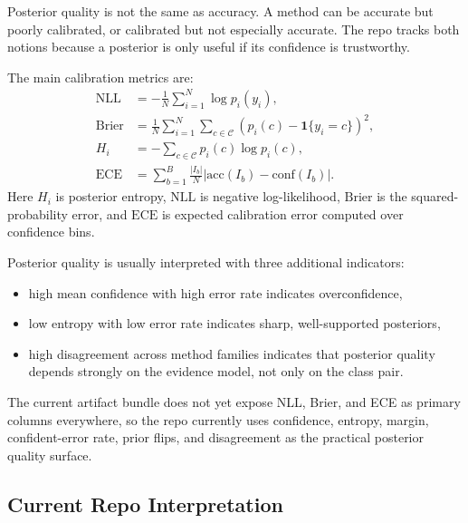 \documentclass[11pt]{article}
\begin{document}
Posterior quality is not the same as accuracy. A method can be accurate but
poorly calibrated, or calibrated but not especially accurate. The repo tracks
both notions because a posterior is only useful if its confidence is
trustworthy.

The main calibration metrics are:
\begin{align}
    \mathrm{NLL}
    &=
    -\frac{1}{N}\sum_{i=1}^{N}\log p_i(y_i), \\
    \mathrm{Brier}
    &=
    \frac{1}{N}\sum_{i=1}^{N}\sum_{c\in\mathcal{C}}
    \left(p_i(c)-\mathbf{1}\{y_i=c\}\right)^2, \\
    H_i
    &=
    -\sum_{c\in\mathcal{C}} p_i(c)\log p_i(c), \\
    \mathrm{ECE}
    &=
    \sum_{b=1}^{B}\frac{|I_b|}{N}
    \left|\mathrm{acc}(I_b)-\mathrm{conf}(I_b)\right|.
\end{align}
Here \(H_i\) is posterior entropy, \(\mathrm{NLL}\) is negative
log-likelihood, \(\mathrm{Brier}\) is the squared-probability error, and
\(\mathrm{ECE}\) is expected calibration error computed over confidence bins.

Posterior quality is usually interpreted with three additional indicators:
\begin{itemize}[leftmargin=1.5em]
    \item high mean confidence with high error rate indicates overconfidence,
    \item low entropy with low error rate indicates sharp, well-supported
    posteriors,
    \item high disagreement across method families indicates that posterior
    quality depends strongly on the evidence model, not only on the class pair.
\end{itemize}

The current artifact bundle does not yet expose NLL, Brier, and ECE as primary
columns everywhere, so the repo currently uses confidence, entropy, margin,
confident-error rate, prior flips, and disagreement as the practical posterior
quality surface.

\subsection*{Current Repo Interpretation}
\end{document}
